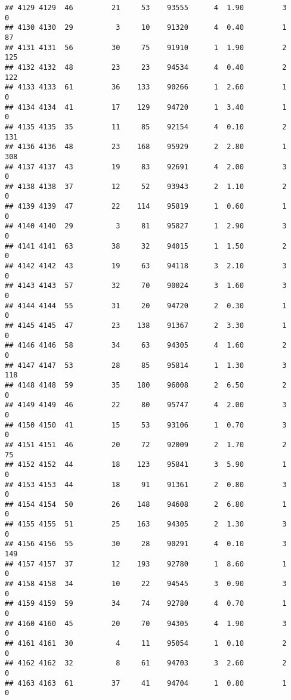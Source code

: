 \documentclass[
]{article}
\begin{document}
\begin{verbatim}
## 4129 4129  46         21     53    93555      4  1.90         3        0
## 4130 4130  29          3     10    91320      4  0.40         1       87
## 4131 4131  56         30     75    91910      1  1.90         2      125
## 4132 4132  48         23     23    94534      4  0.40         2      122
## 4133 4133  61         36    133    90266      1  2.60         1        0
## 4134 4134  41         17    129    94720      1  3.40         1        0
## 4135 4135  35         11     85    92154      4  0.10         2      131
## 4136 4136  48         23    168    95929      2  2.80         1      308
## 4137 4137  43         19     83    92691      4  2.00         3        0
## 4138 4138  37         12     52    93943      2  1.10         2        0
## 4139 4139  47         22    114    95819      1  0.60         1        0
## 4140 4140  29          3     81    95827      1  2.90         3        0
## 4141 4141  63         38     32    94015      1  1.50         2        0
## 4142 4142  43         19     63    94118      3  2.10         3        0
## 4143 4143  57         32     70    90024      3  1.60         3        0
## 4144 4144  55         31     20    94720      2  0.30         1        0
## 4145 4145  47         23    138    91367      2  3.30         1        0
## 4146 4146  58         34     63    94305      4  1.60         2        0
## 4147 4147  53         28     85    95814      1  1.30         3      118
## 4148 4148  59         35    180    96008      2  6.50         2        0
## 4149 4149  46         22     80    95747      4  2.00         3        0
## 4150 4150  41         15     53    93106      1  0.70         3        0
## 4151 4151  46         20     72    92009      2  1.70         2       75
## 4152 4152  44         18    123    95841      3  5.90         1        0
## 4153 4153  44         18     91    91361      2  0.80         3        0
## 4154 4154  50         26    148    94608      2  6.80         1        0
## 4155 4155  51         25    163    94305      2  1.30         3        0
## 4156 4156  55         30     28    90291      4  0.10         3      149
## 4157 4157  37         12    193    92780      1  8.60         1        0
## 4158 4158  34         10     22    94545      3  0.90         3        0
## 4159 4159  59         34     74    92780      4  0.70         1        0
## 4160 4160  45         20     70    94305      4  1.90         3        0
## 4161 4161  30          4     11    95054      1  0.10         2        0
## 4162 4162  32          8     61    94703      3  2.60         2        0
## 4163 4163  61         37     41    94704      1  0.80         1        0

\end{verbatim}
\end{document}
